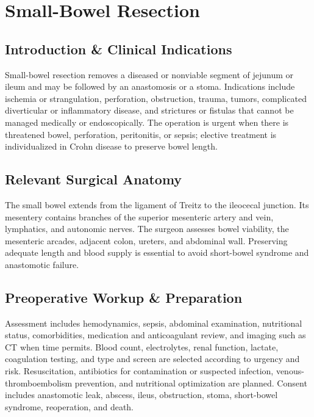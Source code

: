 \chapter{Small-Bowel Resection}

\section*{Introduction \& Clinical Indications}
Small-bowel resection removes a diseased or nonviable segment of jejunum or ileum and may be followed by an anastomosis or a stoma. Indications include ischemia or strangulation, perforation, obstruction, trauma, tumors, complicated diverticular or inflammatory disease, and strictures or fistulas that cannot be managed medically or endoscopically. The operation is urgent when there is threatened bowel, perforation, peritonitis, or sepsis; elective treatment is individualized in Crohn disease to preserve bowel length.

\section*{Relevant Surgical Anatomy}
The small bowel extends from the ligament of Treitz to the ileocecal junction. Its mesentery contains branches of the superior mesenteric artery and vein, lymphatics, and autonomic nerves. The surgeon assesses bowel viability, the mesenteric arcades, adjacent colon, ureters, and abdominal wall. Preserving adequate length and blood supply is essential to avoid short-bowel syndrome and anastomotic failure.

\section*{Preoperative Workup \& Preparation}
Assessment includes hemodynamics, sepsis, abdominal examination, nutritional status, comorbidities, medication and anticoagulant review, and imaging such as CT when time permits. Blood count, electrolytes, renal function, lactate, coagulation testing, and type and screen are selected according to urgency and risk. Resuscitation, antibiotics for contamination or suspected infection, venous-thromboembolism prevention, and nutritional optimization are planned. Consent includes anastomotic leak, abscess, ileus, obstruction, stoma, short-bowel syndrome, reoperation, and death.

